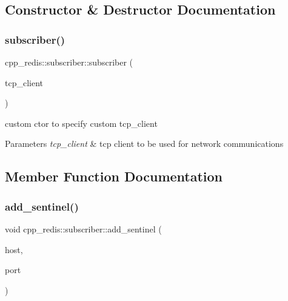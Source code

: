 \subsection{Constructor \& Destructor Documentation}
\mbox{\label{classcpp__redis_1_1subscriber_a66136601f44564842e2c67de2da199af}} 
\subsubsection{\texorpdfstring{subscriber()}{subscriber()}}
{\footnotesize\ttfamily cpp\+\_\+redis\+::subscriber\+::subscriber (\begin{DoxyParamCaption}\item[{const std\+::shared\+\_\+ptr$<$ \hyperlink{classcpp__redis_1_1network_1_1tcp__client__iface}{network\+::tcp\+\_\+client\+\_\+iface} $>$ \&}]{tcp\+\_\+client }\end{DoxyParamCaption})\hspace{0.3cm}{\ttfamily [explicit]}}

custom ctor to specify custom tcp\+\_\+client


\begin{DoxyParams}{Parameters}
{\em tcp\+\_\+client} & tcp client to be used for network communications \\
\hline
\end{DoxyParams}


\subsection{Member Function Documentation}
\mbox{\label{classcpp__redis_1_1subscriber_a10584e201abe4e701b70d078b3a676fc}} 
\subsubsection{\texorpdfstring{add\+\_\+sentinel()}{add\_sentinel()}}
{\footnotesize\ttfamily void cpp\+\_\+redis\+::subscriber\+::add\+\_\+sentinel (\begin{DoxyParamCaption}\item[{const std\+::string \&}]{host,  }\item[{std\+::size\+\_\+t}]{port }\end{DoxyParamCaption})}


